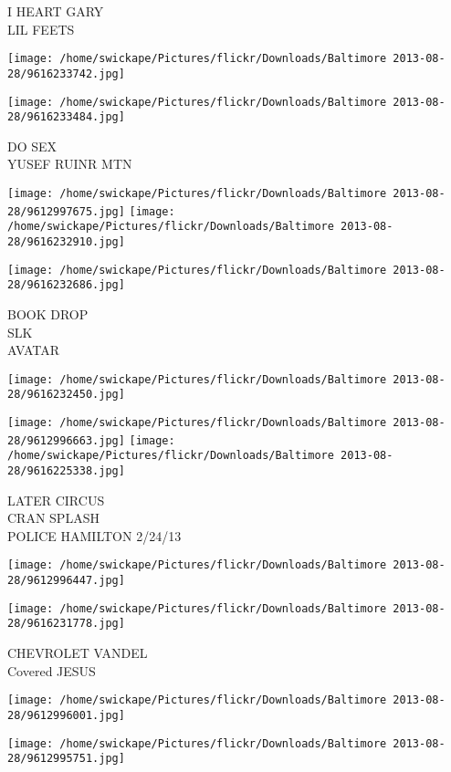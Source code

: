 \documentclass[10pt,letterpaper]{article}
\begin{document}
I HEART GARY\\
LIL FEETS
\pagebreak

\texttt{[image: /home/swickape/Pictures/flickr/Downloads/Baltimore 2013-08-28/9616233742.jpg]}

\vspace{0.25in}
\texttt{[image: /home/swickape/Pictures/flickr/Downloads/Baltimore 2013-08-28/9616233484.jpg]}

DO SEX\\
YUSEF RUINR MTN
\pagebreak

\texttt{[image: /home/swickape/Pictures/flickr/Downloads/Baltimore 2013-08-28/9612997675.jpg]}
\texttt{[image: /home/swickape/Pictures/flickr/Downloads/Baltimore 2013-08-28/9616232910.jpg]}

\texttt{[image: /home/swickape/Pictures/flickr/Downloads/Baltimore 2013-08-28/9616232686.jpg]}

BOOK DROP\\
SLK\\
AVATAR
\pagebreak

\texttt{[image: /home/swickape/Pictures/flickr/Downloads/Baltimore 2013-08-28/9616232450.jpg]}

\vspace{0.25in}
\texttt{[image: /home/swickape/Pictures/flickr/Downloads/Baltimore 2013-08-28/9612996663.jpg]}
\texttt{[image: /home/swickape/Pictures/flickr/Downloads/Baltimore 2013-08-28/9616225338.jpg]}

LATER CIRCUS\\
CRAN SPLASH\\
POLICE HAMILTON 2/24/13
\pagebreak

\texttt{[image: /home/swickape/Pictures/flickr/Downloads/Baltimore 2013-08-28/9612996447.jpg]}

\vspace{0.25in}
\texttt{[image: /home/swickape/Pictures/flickr/Downloads/Baltimore 2013-08-28/9616231778.jpg]}

CHEVROLET VANDEL\\
Covered JESUS
\pagebreak

\texttt{[image: /home/swickape/Pictures/flickr/Downloads/Baltimore 2013-08-28/9612996001.jpg]}

\vspace{0.25in}
\texttt{[image: /home/swickape/Pictures/flickr/Downloads/Baltimore 2013-08-28/9612995751.jpg]}
\end{document}
